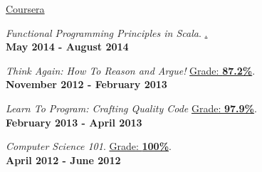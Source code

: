 \begin{outerlist}
\item[] \href{http://www.coursera.org/}{Coursera}%
		\begin{innerlist}
		\item \textit{Functional Programming Principles in Scala}. \href{https://www.coursera.org/course/progfun}. \\ \textbf{May 2014 - August 2014}
		\item \textit{Think Again: How To Reason and Argue!} \href{https://www.coursera.org/maestro/api/certificate/get_certificate?course_id=226}{Grade: \textbf{87.2\%}}.\\ \textbf{November 2012 - February 2013}
		\item \textit{Learn To Program: Crafting Quality Code} \href{https://www.coursera.org/maestro/api/certificate/get_certificate?course_id=254}{Grade: \textbf{97.9\%}}. \\ \textbf{February 2013 - April 2013}		
		\item \textit{Computer Science 101}. \href{https://www.coursera.org/maestro/api/certificate/get_certificate?course_id=52}{Grade: \textbf{100\%}}. \\ \textbf{April 2012 - June 2012}
		\end{innerlist}
\end{outerlist}

